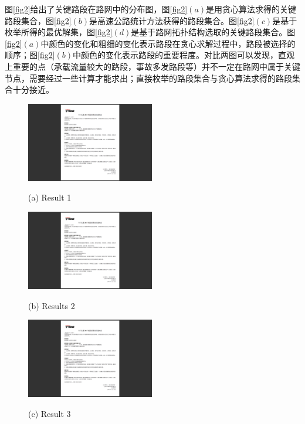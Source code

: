 				图\ref{fig2}给出了关键路段在路网中的分布图，图\ref{fig2}$(a)$是用贪心算法求得的关键路段集合，图\ref{fig2}$(b)$是高速公路统计方法获得的路段集合。图\ref{fig2}$(c)$是基于枚举所得的最优解集，图\ref{fig2}$(d)$是基于路网拓扑结构选取的关键路段集合。图\ref{fig2}$(a)$中颜色的变化和粗细的变化表示路段在贪心求解过程中，路段被选择的顺序；图\ref{fig2}$(b)$中颜色的变化表示路段的重要程度。对比两图可以发现，直观上重要的点（承载流量较大的路段，事故多发路段等）并不一定在路网中属于关键节点，需要经过一些计算才能求出；直接枚举的路段集合与贪心算法求得的路段集合十分接近。

				\begin{figure}
				\begin{minipage}{0.48\linewidth}
				  \centerline{\includegraphics[width=2.2in]{picture/test1}}
				  \centerline{(a) Result 1}
				\end{minipage}
				\hfill
				\begin{minipage}{.48\linewidth}
				  \centerline{\includegraphics[width=2.2in]{picture/test1}}
				  \centerline{(b) Results 2}
				\end{minipage}
				\vfill
				\begin{minipage}{0.48\linewidth}
				  \centerline{\includegraphics[width=2.2in]{picture/test1}}
				  \centerline{(c) Result 3}
				\end{minipage}

\end{figure}
